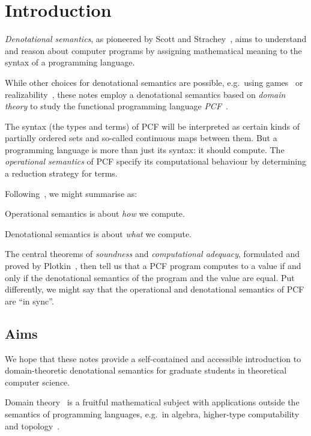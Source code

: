 \chapter{Introduction}

\emph{Denotational semantics}, as pioneered by Scott and
Strachey~\cite{Scott1970,ScottStrachey1971}, aims to understand and reason about
computer programs by assigning mathematical meaning to the syntax of a
programming language.

While other choices for denotational semantics are possible, e.g.\ using
games~\cite{Abramsky1997,Hyland1997} or realizability~\cite{Longley1995}, these
notes employ a denotational semantics based on \emph{domain theory} to study the
functional programming language \emph{PCF}~\cite{Plotkin1977,Scott1993}.

The syntax (the types and terms) of PCF will be interpreted as certain kinds of
partially ordered sets and so-called continuous maps between them.
%
But a programming language is more than just its syntax: it should compute. The
\emph{operational semantics} of PCF specify its computational behaviour by
determining a reduction strategy for terms.

Following~\cite{Escardo2007}, we might summarise as:

\begin{displayquote}
  Operational semantics is about \emph{how} we compute.

  Denotational semantics is about \emph{what} we compute.
\end{displayquote}

The central theorems of \emph{soundness} and \emph{computational adequacy},
formulated and proved by Plotkin~\cite{Plotkin1977}, then tell us that a PCF
program computes to a value if and only if the denotational semantics of the
program and the value are equal.
%
Put differently, we might say that the operational and denotational semantics of
PCF are ``in sync''.

\section{Aims}

We hope that these notes provide a self-contained and accessible introduction to
domain-theoretic denotational semantics for graduate students in theoretical
computer science.

Domain theory~\cite{AbramskyJung1994,GierzEtAl2003} is a fruitful mathematical
subject with applications outside the semantics of programming languages, e.g.\
in algebra, higher-type computability~\cite{LongleyNormann2015} and
topology~\cite{GierzEtAl2003}.


